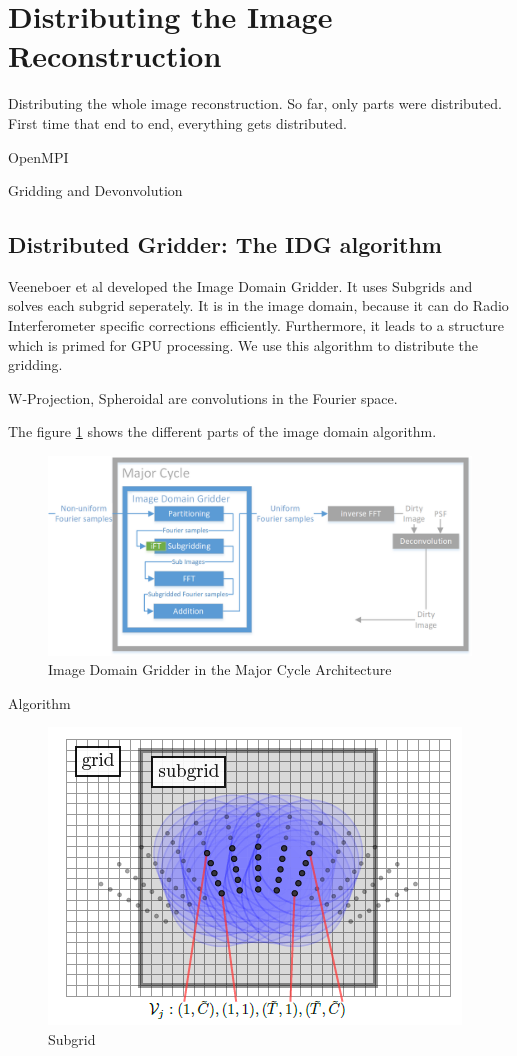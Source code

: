 \section{Distributing the Image Reconstruction}\label{distribution}
Distributing the whole image reconstruction. So far, only parts were distributed. First time that end to end, everything gets distributed.

OpenMPI

Gridding and Devonvolution

\subsection{Distributed Gridder: The IDG algorithm}\label{distribution:idg}
Veeneboer et al\cite{veenboer2017image} developed the Image Domain Gridder. It uses Subgrids and solves each subgrid seperately.
It is in the image domain, because it can do Radio Interferometer specific corrections efficiently. Furthermore, it leads to a structure which is primed for GPU processing.
We use this algorithm to distribute the gridding.

W-Projection, Spheroidal are convolutions in the Fourier space.

The figure \ref{distribution:idg:system} shows the different parts of the image domain algorithm.

\begin{figure}[h]
	\centering
	\includegraphics[width=0.80\linewidth]{./chapters/03.distribution/idg/major-minor-idg.png}
	\caption{Image Domain Gridder in the Major Cycle Architecture}
	\label{distribution:idg:system}
\end{figure}

Algorithm
\begin{figure}[h]
	\centering
	\includegraphics[width=0.40\linewidth]{./chapters/03.distribution/idg/subgrid.png}
	\caption{Subgrid}
	\label{distribution:idg:subgrid}
\end{figure}

